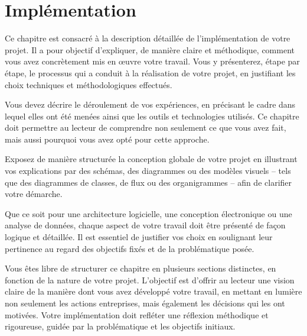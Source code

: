 \chapter{Implémentation}

Ce chapitre est consacré à la description détaillée de l'implémentation de votre projet. Il a pour objectif d'expliquer, de manière claire et méthodique, comment vous avez concrètement mis en œuvre votre travail. Vous y présenterez, étape par étape, le processus qui a conduit à la réalisation de votre projet, en justifiant les choix techniques et méthodologiques effectués.

Vous devez décrire le déroulement de vos expériences, en précisant le cadre dans lequel elles ont été menées ainsi que les outils et technologies utilisés. Ce chapitre doit permettre au lecteur de comprendre non seulement ce que vous avez fait, mais aussi pourquoi vous avez opté pour cette approche.

Exposez de manière structurée la conception globale de votre projet en illustrant vos explications par des schémas, des diagrammes ou des modèles visuels -- tels que des diagrammes de classes, de flux ou des organigrammes -- afin de clarifier votre démarche.

Que ce soit pour une architecture logicielle, une conception électronique ou une analyse de données, chaque aspect de votre travail doit être présenté de façon logique et détaillée. Il est essentiel de justifier vos choix en soulignant leur pertinence au regard des objectifs fixés et de la problématique posée.

Vous êtes libre de structurer ce chapitre en plusieurs sections distinctes, en fonction de la nature de votre projet. L'objectif est d'offrir au lecteur une vision claire de la manière dont vous avez développé votre travail, en mettant en lumière non seulement les actions entreprises, mais également les décisions qui les ont motivées. Votre implémentation doit refléter une réflexion méthodique et rigoureuse, guidée par la problématique et les objectifs initiaux.
